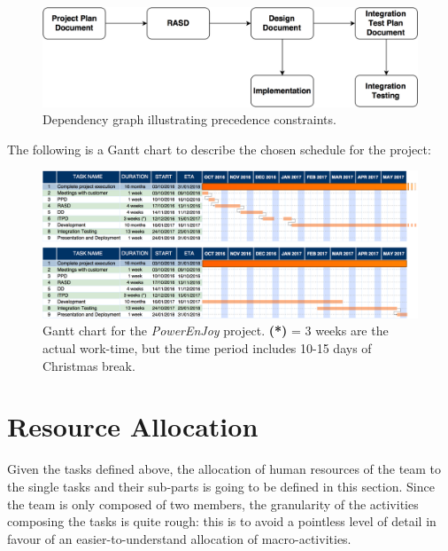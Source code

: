 \begin{figure}[H]
\begin{center}
		\centerline{\includegraphics[width=\textwidth]{./pictures/dependencies_dag.png}}
		\caption{Dependency graph illustrating precedence constraints.}
		\label{dep_dag}
\end{center}
\end{figure}
\newpage
\noindent
The following is a Gantt chart to describe the chosen schedule for the project:
\newline
\begin{figure}[H]
\begin{center}
		\centerline{\includegraphics[width=1.3\textwidth]{./pictures/gantt_chart.png}}
		\caption{Gantt chart for the \textit{PowerEnJoy} project.
		\newline
		\textbf{(*)} = 3 weeks are the actual work-time, but the time period includes 10-15 days of Christmas break.}
		\label{dep_dag}
\end{center}
\end{figure}

\section{Resource Allocation}
Given the tasks defined above, the allocation of human resources of the team to the single tasks and their sub-parts is going to be defined in this section. Since the team is only composed of two members, the granularity of the activities composing the tasks is quite rough: this is to avoid a pointless level of detail in favour of an easier-to-understand allocation of macro-activities.

